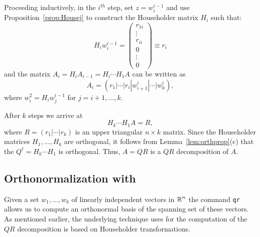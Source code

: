 \documentclass{ximera}
\begin{document}
Proceeding inductively, in the $i^{th}$ step, set $z=w_i^{i-1}$ and use
Proposition~\ref{prop:Housej} to construct the Householder matrix $H_i$ such
that:
\[
H_i w_i^{i-1} = \left(\begin{array}{c} r_{1i}\\ \vdots\\r_{ii}\\ 0 \\
\vdots\\ 0 \end{array}\right) \equiv r_i
\]
and the matrix $A_i=H_iA_{i-1}=H_i\cdots H_1 A$ can be written as
\[
A_i=(r_1|\cdots|r_i|w_{i+1}^i|\cdots|w_k^i),
\]
where $w_i^2=H_iw_j^{i-1}$ for $j=i+1,\ldots,k$.

After $k$ steps we arrive at
\[
H_k\cdots H_1 A = R,
\]
where $R=(r_1|\cdots|r_k)$ is an upper triangular $n\times k$ matrix.
Since the Householder matrices $H_1,\ldots,H_k$ are orthogonal, it follows
from Lemma~\ref{lem:orthprop}(c) that the $Q^t = H_k\cdots H_1$ is
orthogonal.  Thus, $A = QR$ is a $QR$ decomposition of $A$.

\subsection*{Orthonormalization with \Matlab}

Given a set $w_1,\ldots,w_k$ of linearly independent vectors in $\mbox{$\Bbb{R}$}^n$
the \Matlab command {\tt qr} allows us to compute an
orthonormal basis
of the spanning set
of these vectors.  As mentioned earlier, the underlying
technique \Matlab uses for the computation of the $QR$ decomposition is based
on
Householder transformations.
\end{document}

